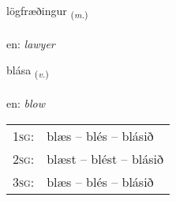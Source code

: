 \documentclass[frontgrid, backgrid]{flacards}\usepackage[]{graphicx}\usepackage[]{xcolor}
\begin{document}
\renewcommand{\flhead}{\vskip5pt \fboxsep=0pt {\small\bfseries\footnotesize Nafnorð | Noun}}
\renewcommand{\fcfoot}{\vskip5pt \fboxsep=0pt \hspace{2pt}{\small\bfseries\footnotesize 3K}}

\renewcommand{\blhead}{\vskip5pt {\small\bfseries\footnotesize Nafnorð | Noun }}
\renewcommand{\bcfoot}{\vskip5pt \hspace{2pt}{\small\bfseries\footnotesize 3K}}


{lögfræðingur \small{\textsubscript{(\textit{m.})}} \\[1ex] %
\textphonetic{[lœxfraiðiŋkʏr]} \\
en: \emph{lawyer} \\  [2ex]
\renewcommand*{\arraystretch}{0.8}
}

\renewcommand{\flhead}{\vskip5pt \fboxsep=0pt {\small\bfseries\footnotesize Sagnorð | Verb}}
\renewcommand{\fcfoot}{\vskip5pt \fboxsep=0pt \hspace{2pt}{\small\bfseries\footnotesize 3K}}

\renewcommand{\blhead}{\vskip5pt {\small\bfseries\footnotesize Sagnorð | Verb }}
\renewcommand{\bcfoot}{\vskip5pt \hspace{2pt}{\small\bfseries\footnotesize 3K}}


{blása \small{\textsubscript{(\textit{v.})}} \\[1ex] %
\textphonetic{[plauːsa]} \\
en: \emph{blow} \\  [2ex]
\renewcommand*{\arraystretch}{0.8}
\begin{tabular}{p{1cm}l}
\textsc{1sg}: & blæs -- blés -- blásið \\ 
\textsc{2sg}: & blæst -- blést -- blásið \\ 
\textsc{3sg}: & blæs -- blés -- blásið \\ 
\end{tabular}
}
\end{document}
